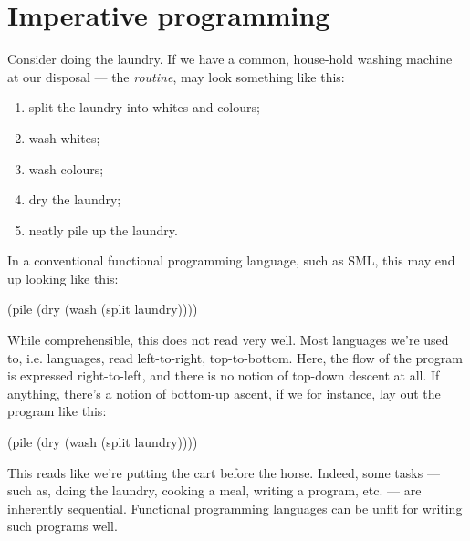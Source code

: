 \chapter{Imperative programming}

Consider doing the laundry. If we have a common, house-hold washing machine at
our disposal --- the \emph{routine}, may look something like this:

\begin{enumerate}

\item split the laundry into whites and colours;

\item wash whites;

\item wash colours;

\item dry the laundry;

\item neatly pile up the laundry.

\end{enumerate}

In a conventional functional programming language, such as SML, this may end up
looking like this:

\begin{code}
(pile (dry (wash (split laundry))))
\end{code}

While comprehensible, this does not read very well. Most languages we're used
to, i.e.  languages, read
left-to-right, top-to-bottom. Here, the flow of the program is expressed
right-to-left, and there is no notion of top-down descent at all. If anything,
there's a notion of bottom-up ascent, if we for instance, lay out the program
like this:

\begin{code}
(pile
  (dry
    (wash
      (split laundry))))
\end{code}

This reads like we're putting the cart before the horse. Indeed, some tasks ---
such as, doing the laundry, cooking a meal, writing a program, etc. --- are
inherently sequential. Functional programming languages can be
 unfit for writing such
programs well.

